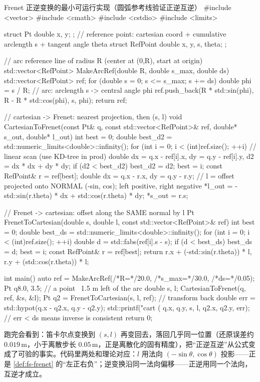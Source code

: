 \begin{codebox}[C++]{Frenet 正逆变换的最小可运行实现（圆弧参考线验证正逆互逆）}
#include <vector>
#include <cmath>
#include <cstdio>
#include <limits>

struct Pt { double x, y; };
// reference point: cartesian coord + cumulative arclength s + tangent angle theta
struct RefPoint { double x, y, s, theta; };

// arc reference line of radius R (center at (0,R), start at origin)
std::vector<RefPoint> MakeArcRef(double R, double s_max, double ds) {
  std::vector<RefPoint> ref;
  for (double s = 0; s <= s_max; s += ds) {
    double phi = s / R;                       // arc: arclength s -> central angle phi
    ref.push_back({R * std::sin(phi), R - R * std::cos(phi), s, phi});
  }
  return ref;
}

// cartesian -> Frenet: nearest projection, then (s, l)
void CartesianToFrenet(const Pt& q, const std::vector<RefPoint>& ref,
                       double* s_out, double* l_out) {
  int best = 0; double best_d2 = std::numeric_limits<double>::infinity();
  for (int i = 0; i < (int)ref.size(); ++i) {      // linear scan (use KD-tree in prod)
    double dx = q.x - ref[i].x, dy = q.y - ref[i].y, d2 = dx * dx + dy * dy;
    if (d2 < best_d2) { best_d2 = d2; best = i; }
  }
  const RefPoint& r = ref[best];
  double dx = q.x - r.x, dy = q.y - r.y;
  // l = offset projected onto NORMAL (-sin, cos); left positive, right negative
  *l_out = -std::sin(r.theta) * dx + std::cos(r.theta) * dy;
  *s_out = r.s;
}

// Frenet -> cartesian: offset along the SAME normal by l
Pt FrenetToCartesian(double s, double l, const std::vector<RefPoint>& ref) {
  int best = 0; double best_ds = std::numeric_limits<double>::infinity();
  for (int i = 0; i < (int)ref.size(); ++i) {
    double d = std::fabs(ref[i].s - s);
    if (d < best_ds) { best_ds = d; best = i; }
  }
  const RefPoint& r = ref[best];
  return {r.x + (-std::sin(r.theta)) * l, r.y + (std::cos(r.theta)) * l};
}

int main() {
  auto ref = MakeArcRef(/*R=*/20.0, /*s_max=*/30.0, /*ds=*/0.05);
  Pt q{8.0, 3.5};                              // a point ~1.5 m left of the arc
  double s, l;
  CartesianToFrenet(q, ref, &s, &l);
  Pt q2 = FrenetToCartesian(s, l, ref);        // transform back
  double err = std::hypot(q.x - q2.x, q.y - q2.y);
  std::printf("cart (%
              q.x, q.y, s, l, q2.x, q2.y, err);   // err < ds means inverse is consistent
  return 0;
}
\end{codebox}
跑完会看到：笛卡尔点变换到 $(s,l)$ 再变回去，落回几乎同一位置（还原误差约 $0.019\,\mathrm{m}$，小于离散步长 $0.05\,\mathrm{m}$，正是离散化的固有精度），把“正逆互逆”从公式变成了可验的事实。代码里两处和理论对应：$l$ 用法向 $(-\sin\theta,\cos\theta)$ 投影——正是 \cref{def:fs-frenet} 的“左正右负”；逆变换沿同一法向偏移——正逆用同一个法向，互逆才成立。

